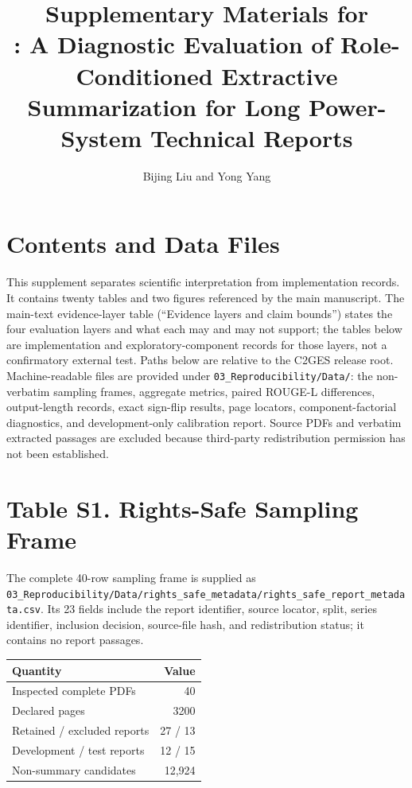 \documentclass[11pt]{article}
\title{Supplementary Materials for\\
\cges{}: A Diagnostic Evaluation of Role-Conditioned Extractive Summarization for Long Power-System Technical Reports}
\author{Bijing Liu and Yong Yang}
\date{}
\begin{document}
\maketitle

\section*{Contents and Data Files}

This supplement separates scientific interpretation from implementation records. It contains twenty tables and two figures referenced by the main manuscript. The main-text evidence-layer table (``Evidence layers and claim bounds'') states the four evaluation layers and what each may and may not support; the tables below are implementation and exploratory-component records for those layers, not a confirmatory external test. Paths below are relative to the C2GES release root. Machine-readable files are provided under \nolinkurl{03_Reproducibility/Data/}: the non-verbatim sampling frames, aggregate metrics, paired ROUGE-L differences, output-length records, exact sign-flip results, page locators, component-factorial diagnostics, and development-only calibration report. Source PDFs and verbatim extracted passages are excluded because third-party redistribution permission has not been established.

\section*{Table S1. Rights-Safe Sampling Frame}

The complete 40-row sampling frame is supplied as \nolinkurl{03_Reproducibility/Data/rights_safe_metadata/rights_safe_report_metadata.csv}. Its 23 fields include the report identifier, source locator, split, series identifier, inclusion decision, source-file hash, and redistribution status; it contains no report passages.

\begin{center}
\begin{tabular}{lr}
\toprule
Quantity & Value\\
\midrule
Inspected complete PDFs & 40\\
Declared pages & 3200\\
Retained / excluded reports & 27 / 13\\
Development / test reports & 12 / 15\\
Non-summary candidates & 12,924\\
\bottomrule
\end{tabular}
\end{center}
\end{document}
